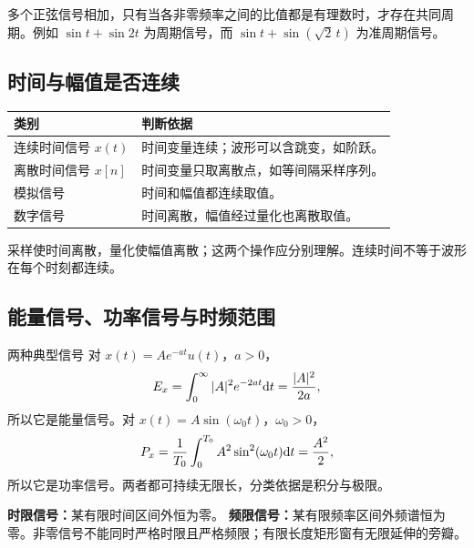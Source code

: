 多个正弦信号相加，只有当各非零频率之间的比值都是有理数时，才存在共同周期。例如 $\sin t+\sin 2t$ 为周期信号，而 $\sin t+\sin(\sqrt{2}\,t)$ 为准周期信号。


\subsection{时间与幅值是否连续}

\begin{table}[H]
\centering
\begin{tabularx}{\linewidth}{@{}l X@{}}
\toprule
类别 & 判断依据 \\
\midrule
连续时间信号 $x(t)$ & 时间变量连续；波形可以含跳变，如阶跃。 \\
离散时间信号 $x[n]$ & 时间变量只取离散点，如等间隔采样序列。 \\
模拟信号 & 时间和幅值都连续取值。 \\
数字信号 & 时间离散，幅值经过量化也离散取值。 \\
\bottomrule
\end{tabularx}
\end{table}

采样使时间离散，量化使幅值离散；这两个操作应分别理解。连续时间不等于波形在每个时刻都连续。

\subsection{能量信号、功率信号与时频范围}


\begin{Example}[breakable=false]{两种典型信号}{}
对 $x(t)=Ae^{-at}u(t)$，$a>0$，
\[
E_x=\int_0^{\infty}|A|^2e^{-2at}\mathrm{d} t=\frac{|A|^2}{2a},
\]
所以它是能量信号。对 $x(t)=A\sin(\omega_0t)$，$\omega_0>0$，
\[
P_x=\frac{1}{T_0}\int_0^{T_0}A^2\sin^2(\omega_0t)\mathrm{d} t=\frac{A^2}{2},
\]
所以它是功率信号。两者都可持续无限长，分类依据是积分与极限。
\end{Example}

\textbf{时限信号：}某有限时间区间外恒为零。\quad
\textbf{频限信号：}某有限频率区间外频谱恒为零。非零信号不能同时严格时限且严格频限；有限长度矩形窗有无限延伸的旁瓣。

